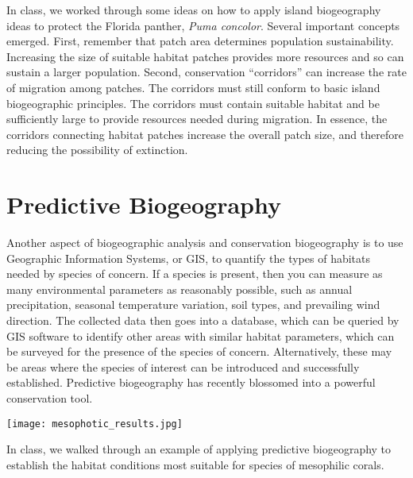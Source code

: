 \documentclass[letterpaper]{tufte-handout}
\begin{document}
In class, we worked through some ideas on how to apply island biogeography ideas to protect the Florida panther, \textit{Puma concolor}. Several important concepts emerged.  First, remember that patch area determines population sustainability.  Increasing the size of suitable habitat patches provides more resources and so can sustain a larger population.  Second, conservation ``corridors'' can increase the rate of migration among patches.  The corridors must still conform to basic island biogeographic principles.  The corridors must contain suitable habitat and be sufficiently large to provide resources needed during migration.  In essence, the corridors connecting habitat patches increase the overall patch size, and therefore reducing the possibility of extinction.

\section{Predictive Biogeography}
Another aspect of biogeographic analysis and conservation biogeography is to use Geographic Information Systems, or GIS, to quantify the types of habitats needed by species of concern.  If a species is present, then you can measure as many environmental parameters as reasonably possible, such as annual precipitation, seasonal temperature variation, soil types, and prevailing wind direction. The collected data then goes into a database, which can be queried by GIS software to identify other areas with similar habitat parameters, which can be surveyed for the presence of the species of concern. Alternatively, these may be areas where the species of interest can be introduced and successfully established.  Predictive biogeography has recently blossomed into a powerful conservation tool.  
\begin{marginfigure}%
	\texttt{[image: mesophotic\_results.jpg]}
\end{marginfigure} 
In class, we walked through an example of applying predictive biogeography to establish the habitat conditions most suitable for species of mesophilic corals.
\end{document}
